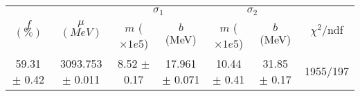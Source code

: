 \begin{tabular}{c|c|cc|cc||c}
 \multirow{2}{*}{$f$ $(\%)$} & \multirow{2}{*}{$\mu$ $(MeV)$} & \multicolumn{2}{|c|}{$\sigma_1$} & \multicolumn{2}{|c||}{$\sigma_2$} & \multirow{2}{*}{$\chi^2/$ndf} \\
 & & $m$ ($\times1e5$) & $b$ (MeV) & $m$ ($\times1e5$) & $b$ (MeV) & \\
\hline
59.31 $\pm$ 0.42 & 3093.753 $\pm$ 0.011 & 8.52 $\pm$ 0.17 & 17.961 $\pm$ 0.071 & 10.44 $\pm$ 0.41 & 31.85 $\pm$ 0.17 & 1955/197\\
\end{tabular}
